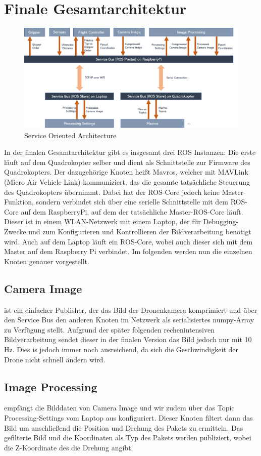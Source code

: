 \pagebreak
\section{Finale Gesamtarchitektur}
\begin{figure}[h]
	\centering
	\includegraphics[scale=0.51]{"Grafiken/gesamtarchitektur.png"}
	\caption{Service Oriented Architecture}
	\label{fig:meine-grafik}
\end{figure}
In der finalen Gesamtarchitektur gibt es insgesamt drei ROS Instanzen: Die erste läuft auf dem Quadrokopter selber und dient als Schnittstelle zur Firmware des Quadrokopters. Der dazugehörige Knoten heißt Mavros, welcher mit MAVLink (Micro Air Vehicle Link) kommuniziert, das die gesamte tatsächliche Steuerung des Quadrokopters übernimmt. Dabei hat der ROS-Core jedoch keine Master-Funktion, sondern verbindet sich über eine serielle Schnittstelle mit dem ROS-Core auf dem RaspberryPi, auf dem der tatsächliche Master-ROS-Core läuft. Dieser ist in einem WLAN-Netzwerk mit einem Laptop, der für Debugging-Zwecke und zum Konfigurieren und Kontrollieren der Bildverarbeitung benötigt wird. Auch auf dem Laptop läuft ein ROS-Core, wobei auch dieser sich mit dem Master auf dem Raspberry Pi verbindet. Im folgenden werden nun die einzelnen Knoten genauer vorgestellt.
\subsection{Camera Image} ist ein einfacher Publisher, der das Bild der Dronenkamera komprimiert und über den Service Bus den anderen Knoten im Netzwerk als serialisiertes numpy-Array zu Verfügung stellt. Aufgrund der später folgenden rechenintensiven Bildverarbeitung sendet dieser in der finalen Version das Bild jedoch nur mit 10 Hz. Dies is jedoch immer noch ausreichend, da sich die Geschwindigkeit der Drone nicht schnell ändern wird. 
\subsection{Image Processing} empfängt die Bilddaten von Camera Image und wir zudem über das Topic Processing-Settings vom Laptop aus konfiguriert. Dieser Knoten filtert dann das Bild um anschließend die Position und Drehung des Pakets zu ermitteln. Das gefilterte Bild und die Koordinaten als Typ  des Pakets werden publiziert, wobei die Z-Koordinate des  die Drehung angibt.

